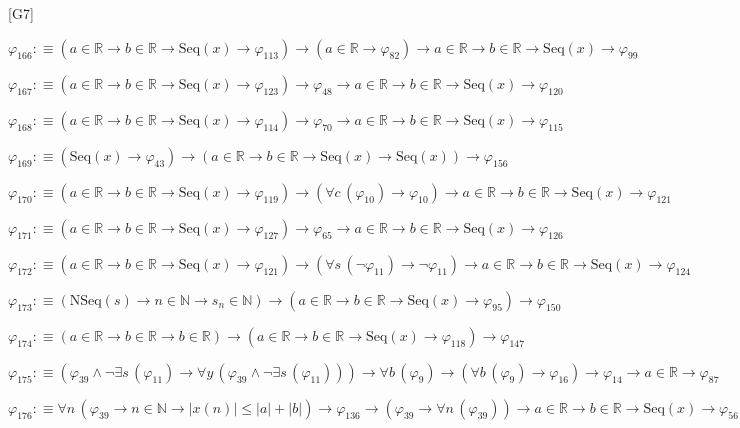 \begin{fullproof}{[G7]}
\begin{abbrevlist}
\item $\varphi_{166} :\equiv (a \in \mathbb{R} \to b \in \mathbb{R} \to \mathrm{Seq}(x) \to \varphi_{113}) \to (a \in \mathbb{R} \to \varphi_{82}) \to a \in \mathbb{R} \to b \in \mathbb{R} \to \mathrm{Seq}(x) \to \varphi_{99}$
\item $\varphi_{167} :\equiv (a \in \mathbb{R} \to b \in \mathbb{R} \to \mathrm{Seq}(x) \to \varphi_{123}) \to \varphi_{48} \to a \in \mathbb{R} \to b \in \mathbb{R} \to \mathrm{Seq}(x) \to \varphi_{120}$
\item $\varphi_{168} :\equiv (a \in \mathbb{R} \to b \in \mathbb{R} \to \mathrm{Seq}(x) \to \varphi_{114}) \to \varphi_{70} \to a \in \mathbb{R} \to b \in \mathbb{R} \to \mathrm{Seq}(x) \to \varphi_{115}$
\item $\varphi_{169} :\equiv (\mathrm{Seq}(x) \to \varphi_{43}) \to (a \in \mathbb{R} \to b \in \mathbb{R} \to \mathrm{Seq}(x) \to \mathrm{Seq}(x)) \to \varphi_{156}$
\item $\varphi_{170} :\equiv (a \in \mathbb{R} \to b \in \mathbb{R} \to \mathrm{Seq}(x) \to \varphi_{119}) \to (\forall c\,(\varphi_{10}) \to \varphi_{10}) \to a \in \mathbb{R} \to b \in \mathbb{R} \to \mathrm{Seq}(x) \to \varphi_{121}$
\item $\varphi_{171} :\equiv (a \in \mathbb{R} \to b \in \mathbb{R} \to \mathrm{Seq}(x) \to \varphi_{127}) \to \varphi_{65} \to a \in \mathbb{R} \to b \in \mathbb{R} \to \mathrm{Seq}(x) \to \varphi_{126}$
\item $\varphi_{172} :\equiv (a \in \mathbb{R} \to b \in \mathbb{R} \to \mathrm{Seq}(x) \to \varphi_{121}) \to (\forall s\,(\neg \varphi_{11}) \to \neg \varphi_{11}) \to a \in \mathbb{R} \to b \in \mathbb{R} \to \mathrm{Seq}(x) \to \varphi_{124}$
\item $\varphi_{173} :\equiv (\mathrm{NSeq}(s) \to n \in \mathbb{N} \to s_{n} \in \mathbb{N}) \to (a \in \mathbb{R} \to b \in \mathbb{R} \to \mathrm{Seq}(x) \to \varphi_{95}) \to \varphi_{150}$
\item $\varphi_{174} :\equiv (a \in \mathbb{R} \to b \in \mathbb{R} \to b \in \mathbb{R}) \to (a \in \mathbb{R} \to b \in \mathbb{R} \to \mathrm{Seq}(x) \to \varphi_{118}) \to \varphi_{147}$
\item $\varphi_{175} :\equiv (\varphi_{39} \land \neg \exists s\,(\varphi_{11}) \to \forall y\,(\varphi_{39} \land \neg \exists s\,(\varphi_{11}))) \to \forall b\,(\varphi_{9}) \to (\forall b\,(\varphi_{9}) \to \varphi_{16}) \to \varphi_{14} \to a \in \mathbb{R} \to \varphi_{87}$
\item $\varphi_{176} :\equiv \forall n\,(\varphi_{39} \to n \in \mathbb{N} \to \lvert x(n) \rvert \leq \lvert a \rvert + \lvert b \rvert) \to \varphi_{136} \to (\varphi_{39} \to \forall n\,(\varphi_{39})) \to a \in \mathbb{R} \to b \in \mathbb{R} \to \mathrm{Seq}(x) \to \varphi_{56}$

\end{abbrevlist}
\end{fullproof}
